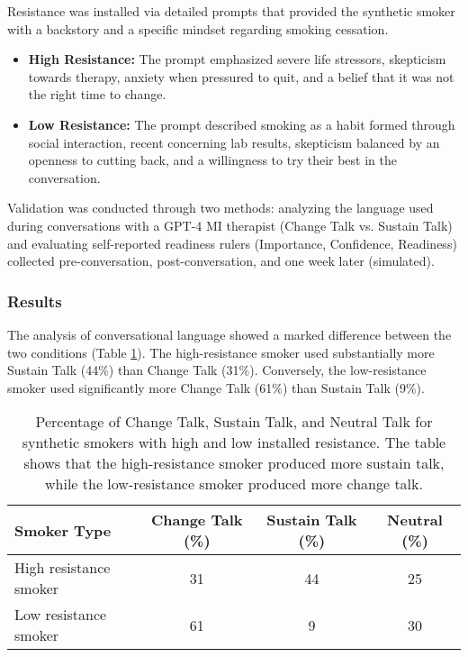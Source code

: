 Resistance was installed via detailed prompts that provided the synthetic smoker with a backstory and a specific mindset regarding smoking cessation.
\begin{itemize}
    \item \textbf{High Resistance:} The prompt emphasized severe life stressors, skepticism towards therapy, anxiety when pressured to quit, and a belief that it was not the right time to change.
    \item \textbf{Low Resistance:} The prompt described smoking as a habit formed through social interaction, recent concerning lab results, skepticism balanced by an openness to cutting back, and a willingness to try their best in the conversation.
\end{itemize}
Validation was conducted through two methods: analyzing the language used during conversations with a GPT-4 MI therapist (Change Talk vs. Sustain Talk) and evaluating self-reported readiness rulers (Importance, Confidence, Readiness) collected pre-conversation, post-conversation, and one week later (simulated).

\subsubsection{Results}

The analysis of conversational language showed a marked difference between the two conditions (Table \ref{tab:resistance_change_sustain}). The high-resistance smoker used substantially more Sustain Talk (44\%) than Change Talk (31\%). Conversely, the low-resistance smoker used significantly more Change Talk (61\%) than Sustain Talk (9\%).

\begin{table}[h]
\centering
\caption[Change and Sustain Talk for High/Low Resistance Smokers]{Percentage of Change Talk, Sustain Talk, and Neutral Talk for synthetic smokers with high and low installed resistance. The table shows that the high-resistance smoker produced more sustain talk, while the low-resistance smoker produced more change talk.}
\label{tab:resistance_change_sustain}
\begin{tabular}{|l|c|c|c|}
\hline
\textbf{Smoker Type} & \textbf{Change Talk (\%)} & \textbf{Sustain Talk (\%)} & \textbf{Neutral (\%)} \\ \hline
High resistance smoker & 31 & 44 & 25 \\ \hline
Low resistance smoker & 61 & 9 & 30 \\ \hline
\end{tabular}
\end{table}


